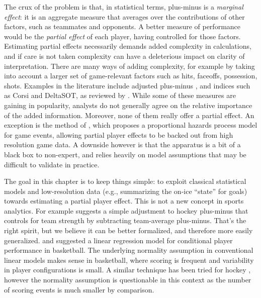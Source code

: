 The crux of the problem is that, in statistical terms, plus-minus is a {\em
marginal effect}: it is an aggregate measure that averages over the
contributions of other factors, such as teammates and opponents.  A better
measure of performance would be the {\em partial effect} of each player,
having controlled for those factors.  Estimating partial effects necessarily
demands added complexity in calculations, and if care is not taken complexity
can have a deleterious impact on clarity of interpretation.  There are many
ways of adding complexity, for example by taking into account a larger set of
game-relevant factors such as hits, faceoffs, possession, shots.  Examples in
the literature include adjusted plus-minus \cite{schlocwel10}, and indices
such as Corsi and DeltaSOT, as reviewed by \cite{vol10}.  While some of these
measures are gaining in popularity, analysts do not generally agree on the
relative importance of the added information.  Moreover, none of them really
offer a partial effect.  An exception is the method of \cite{ThoVenJen12},
which proposes a proportional hazards process model for game events, allowing
partial player effects to be backed out from high resolution game data. A
downside however is that the apparatus is a bit of a black box to non-expert,
and relies heavily on model assumptions that may be difficult to validate in
practice.

The goal in this chapter is to keep things simple: to exploit classical
statistical models and low-resolution data (e.g., summarizing the on-ice
``state'' for goals) towards estimating a partial player effect.  This is not a
new concept in sports analytics.  For example \cite{awa09} suggests a simple
adjustment to hockey plus-minus that controls for team strength by subtracting
team-average plus-minus.  That's the right spirit, but we believe it can be
better formalized, and therefore more easily generalized.  \cite{ros04} and
\cite{ilabar08} suggested a linear regression model for conditional player
performance in basketball.  The underlying normality assumption in
conventional linear models makes sense in basketball, where scoring is
frequent and variability in player configurations is small.  A similar
technique has been tried for hockey \cite{mac10}, however the normality
assumption is questionable in this context as the number of scoring events is
much smaller by comparison.

